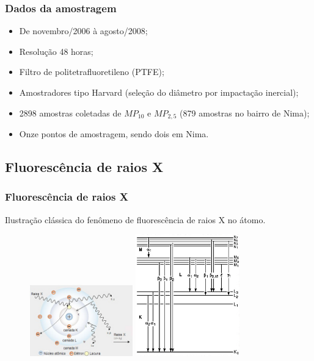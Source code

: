 \begin{frame}
	\frametitle{Dados da amostragem}
	\begin{itemize}
		\item De novembro/2006 à agosto/2008;
		\item Resolução 48 horas;
		\item Filtro de politetrafluoretileno (PTFE);
		\item Amostradores tipo Harvard (seleção do diâmetro por impactação inercial);
		\item 2898 amostras coletadas de $MP_{10}$ e $MP_{2,5}$ (879 amostras no bairro de Nima);
		\item Onze pontos de amostragem, sendo dois em Nima.
	\end{itemize}
\end{frame}

\subsection{Fluorescência de raios X}
\begin{frame}
  \frametitle{Fluorescência de raios X}
  Ilustração clássica do fenômeno de fluorescência de raios X no átomo.
  \begin{figure}[H]
    \centering
    \includegraphics[width=0.4\textwidth]{../../inputs/images/shimadzu_atomo.jpg}
    \hspace{1cm}
    \includegraphics[width=0.4\textwidth]{../../inputs/images/Siegbahn.jpg}
  \end{figure}
\end{frame}

